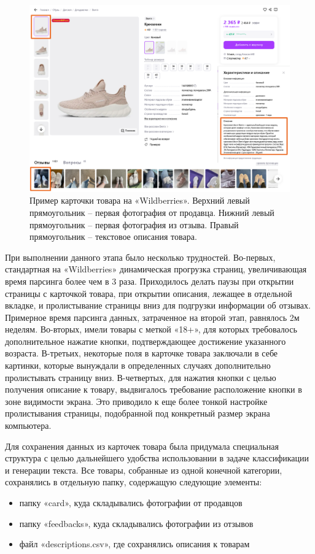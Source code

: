 \documentclass[a4paper,12pt]{extarticle}
\begin{document}
\begin{figure}[hbtp]
	\centering
	\includegraphics[scale=0.8]{wildberries2.png}
	\caption{Пример карточки товара на «Wildberries». Верхний левый прямоугольник – первая фотография от продавца. Нижний левый прямоугольник – первая фотография из отзыва. Правый прямоугольник – текстовое описания товара.}
	\label{fig:wildberries2}
\end{figure}

При выполнении данного этапа было несколько трудностей. Во-первых, стандартная на «Wildberries» динамическая прогрузка страниц, увеличивающая время парсинга более чем в 3 раза. Приходилось делать паузы при открытии страницы с карточкой товара, при открытии описания, лежащее в отдельной вкладке, и пролистывание страницы вниз для подгрузки информации об отзывах. Примерное время парсинга данных, затраченное на второй этап, равнялось 2м неделям. Во-вторых, имели товары с меткой «18+», для которых требовалось дополнительное нажатие кнопки, подтверждающее достижение указанного возраста. В-третьих, некоторые поля в карточке товара заключали в себе картинки, которые вынуждали в определенных случаях дополнительно пролистывать страницу вниз. В-четвертых, для нажатия кнопки с целью получения описание к товару, выдвигалось требование расположение кнопки в зоне видимости экрана. Это приводило к еще более тонкой настройке пролистывания страницы, подобранной под конкретный размер экрана компьютера.

Для сохранения данных из карточек товара была придумала специальная структура с целью дальнейшего удобства использовании в задаче классификации и генерации текста. Все товары, собранные из одной конечной категории, сохранялись в отдельную папку, содержащую следующие элементы:
\begin{itemize}
	\item папку «card», куда складывались фотографии от продавцов
	\item папку «feedbacks», куда складывались фотографии из отзывов
	\item файл «descriptions.csv», где сохранялись описания к товарам
\end{itemize}
\end{document}
